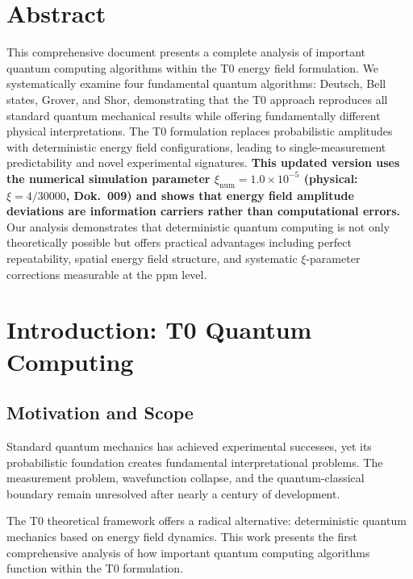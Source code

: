 \section*{Abstract}
		This comprehensive document presents a complete analysis of important quantum computing algorithms within the T0 energy field formulation. We systematically examine four fundamental quantum algorithms: Deutsch, Bell states, Grover, and Shor, demonstrating that the T0 approach reproduces all standard quantum mechanical results while offering fundamentally different physical interpretations. The T0 formulation replaces probabilistic amplitudes with deterministic energy field configurations, leading to single-measurement predictability and novel experimental signatures. \textbf{This updated version uses the numerical simulation parameter $\xi_{\text{num}} = 1.0 \times 10^{-5}$ (physical: $\xi = 4/30000$, Dok.~009) and shows that energy field amplitude deviations are information carriers rather than computational errors.} Our analysis demonstrates that deterministic quantum computing is not only theoretically possible but offers practical advantages including perfect repeatability, spatial energy field structure, and systematic $\xi$-parameter corrections measurable at the ppm level.

	
	
	\section{Introduction: T0 Quantum Computing}
	
	\subsection{Motivation and Scope}
	
	Standard quantum mechanics has achieved experimental successes, yet its probabilistic foundation creates fundamental interpretational problems. The measurement problem, wavefunction collapse, and the quantum-classical boundary remain unresolved after nearly a century of development.
	
	The T0 theoretical framework offers a radical alternative: deterministic quantum mechanics based on energy field dynamics. This work presents the first comprehensive analysis of how important quantum computing algorithms function within the T0 formulation.
	
